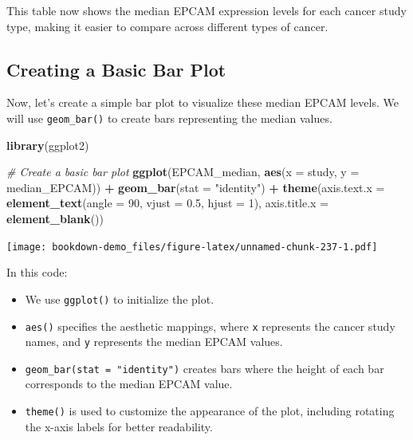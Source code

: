 \documentclass[
]{book}
\newenvironment{Shaded}{\begin{snugshade}}{\end{snugshade}}
\newcommand{\AttributeTok}[1]{\textcolor[rgb]{0.13,0.29,0.53}{#1}}
\newcommand{\CommentTok}[1]{\textcolor[rgb]{0.56,0.35,0.01}{\textit{#1}}}
\newcommand{\DecValTok}[1]{\textcolor[rgb]{0.00,0.00,0.81}{#1}}
\newcommand{\FloatTok}[1]{\textcolor[rgb]{0.00,0.00,0.81}{#1}}
\newcommand{\FunctionTok}[1]{\textcolor[rgb]{0.13,0.29,0.53}{\textbf{#1}}}
\newcommand{\NormalTok}[1]{#1}
\newcommand{\SpecialCharTok}[1]{\textcolor[rgb]{0.81,0.36,0.00}{\textbf{#1}}}
\newcommand{\StringTok}[1]{\textcolor[rgb]{0.31,0.60,0.02}{#1}}
\begin{document}
This table now shows the median EPCAM expression levels for each cancer study type, making it easier to compare across different types of cancer.

\hypertarget{creating-a-basic-bar-plot}{%
\subsection{Creating a Basic Bar Plot}\label{creating-a-basic-bar-plot}}

Now, let's create a simple bar plot to visualize these median EPCAM levels. We will use \texttt{geom\_bar()} to create bars representing the median values.

\begin{Shaded}
\begin{Highlighting}[]
\FunctionTok{library}\NormalTok{(ggplot2)}

\CommentTok{\# Create a basic bar plot}
\FunctionTok{ggplot}\NormalTok{(EPCAM\_median, }\FunctionTok{aes}\NormalTok{(}\AttributeTok{x =}\NormalTok{ study, }\AttributeTok{y =}\NormalTok{ median\_EPCAM)) }\SpecialCharTok{+}
  \FunctionTok{geom\_bar}\NormalTok{(}\AttributeTok{stat =} \StringTok{"identity"}\NormalTok{) }\SpecialCharTok{+}
  \FunctionTok{theme}\NormalTok{(}\AttributeTok{axis.text.x =} \FunctionTok{element\_text}\NormalTok{(}\AttributeTok{angle =} \DecValTok{90}\NormalTok{, }\AttributeTok{vjust =} \FloatTok{0.5}\NormalTok{, }\AttributeTok{hjust =} \DecValTok{1}\NormalTok{),}
        \AttributeTok{axis.title.x =} \FunctionTok{element\_blank}\NormalTok{())}
\end{Highlighting}
\end{Shaded}

\texttt{[image: bookdown-demo\_files/figure-latex/unnamed-chunk-237-1.pdf]}

In this code:

\begin{itemize}
\item
  We use \texttt{ggplot()} to initialize the plot.
\item
  \texttt{aes()} specifies the aesthetic mappings, where \texttt{x} represents the cancer study names, and \texttt{y} represents the median EPCAM values.
\item
  \texttt{geom\_bar(stat\ =\ "identity")} creates bars where the height of each bar corresponds to the median EPCAM value.
\item
  \texttt{theme()} is used to customize the appearance of the plot, including rotating the x-axis labels for better readability.
\end{itemize}
\end{document}
